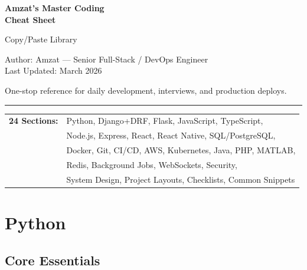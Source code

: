 \documentclass[10pt, a4paper]{article}
\begin{document}
\begin{titlepage}
\centering
\vspace*{3cm}
{\Huge\bfseries\sffamily\textcolor{accent}{Amzat's Master Coding\\[0.3em]Cheat Sheet}\par}
\vspace{1cm}
{\Large\sffamily\textcolor{codecomment}{Copy/Paste Library}\par}
\vspace{2cm}
{\large\sffamily
\textcolor{sectioncolor}{Author: Amzat --- Senior Full-Stack / DevOps Engineer}\\[0.5em]
\textcolor{codecomment}{Last Updated: March 2026}
\par}
\vspace{1.5cm}
{\normalsize\sffamily\textcolor{subsectioncolor}{One-stop reference for daily development, interviews, and production deploys.}\par}
\vspace{2cm}
\textcolor{headerbar}{\rule{0.8\textwidth}{2pt}}
\vspace{1cm}

{\small\sffamily\textcolor{subsectioncolor}{
\begin{tabular}{rl}
\textbf{24 Sections:} & Python, Django+DRF, Flask, JavaScript, TypeScript, \\
& Node.js, Express, React, React Native, SQL/PostgreSQL, \\
& Docker, Git, CI/CD, AWS, Kubernetes, Java, PHP, MATLAB, \\
& Redis, Background Jobs, WebSockets, Security, \\
& System Design, Project Layouts, Checklists, Common Snippets \\
\end{tabular}
}\par}
\end{titlepage}

\tableofcontents
\newpage


\section{Python}


\subsection{Core Essentials}
\end{document}
